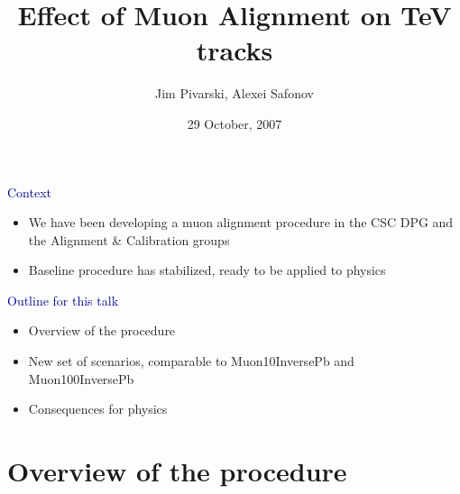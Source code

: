 \documentclass[compress]{beamer}
\title{Effect of Muon Alignment on TeV tracks}
\author{Jim Pivarski, Alexei Safonov}
\institute{Texas A\&M University}
\date{29 October, 2007}
\begin{document}
\frame{\titlepage}

\begin{frame}
\hspace{-0.83 cm} \textcolor{darkblue}{\Large Context}

\vspace{0.1 cm}
\begin{itemize}\setlength{\itemsep}{0.1 cm}
\item We have been developing a muon alignment procedure in the
CSC DPG and the Alignment \& Calibration groups
\item Baseline procedure has stabilized, ready to be applied to physics
\end{itemize}

\vfill
\hspace{-0.83 cm} \textcolor{darkblue}{\Large Outline for this talk}

\vspace{0.1 cm}
\begin{itemize}\setlength{\itemsep}{0.1 cm}
\item Overview of the procedure
\item New set of scenarios, comparable to Muon10InversePb and Muon100InversePb
\item Consequences for physics
\end{itemize}

\label{numpages}
\end{frame}

\section*{Overview of the procedure}
\end{document}

